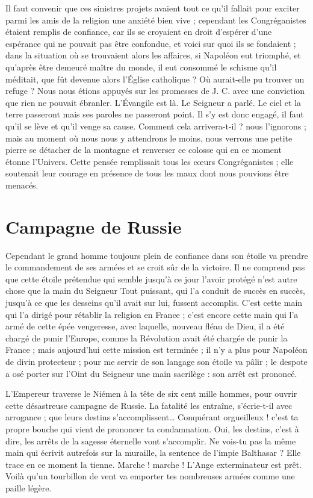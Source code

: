 Il faut convenir que ces sinistres projets avaient tout ce qu'il fallait pour exciter parmi les amis de la religion une anxiété bien vive ; cependant les Congréganistes étaient remplis de confiance, car ils se croyaient en droit d'espérer d'une espérance qui ne pouvait pas être confondue, et voici sur quoi ils se fondaient ; dans la situation où se trouvaient alors les affaires, si Napoléon eut triomphé, et qu'après être demeuré maître du monde, il eut consommé le schisme qu'il méditait, que fût devenue alors l'Église catholique ? Où aurait-elle pu trouver un refuge ? Nous nous étions appuyés sur les promesses de J. C. avec une conviction que rien ne pouvait ébranler. L'Évangile est là. Le Seigneur a parlé. Le ciel et la terre passeront mais ses paroles ne passeront point. Il s'y est donc engagé, il faut qu'il se lève et qu'il venge sa cause. Comment cela arrivera-t-il ? nous l'ignorons ; mais au moment où nous nous y attendrons le moins, nous verrons une petite pierre se détacher de la montagne et renverser ce colosse qui en ce moment étonne l'Univers. Cette pensée remplissait tous les cœurs Congréganistes ; elle soutenait leur courage en présence de tous les maux dont nous pouvions être menacés.

\section*{Campagne de Russie}
Cependant le grand homme toujours plein de confiance dans son étoile va prendre le commandement de ses armées et se croit sûr de la victoire. Il ne comprend pas que cette étoile prétendue qui semble jusqu'à ce jour l'avoir protégé n'est autre chose que la main du Seigneur Tout puissant, qui l'a conduit de succès en succès, jusqu'à ce que les desseins qu'il avait sur lui, fussent accomplis. C'est cette main qui l'a
dirigé pour rétablir la religion en France ; c'est encore cette main qui l'a armé de cette épée vengeresse, avec laquelle, nouveau fléau de Dieu, il a été chargé de punir l'Europe, comme la Révolution avait été chargée de punir la France ; mais aujourd'hui cette mission est terminée ; il n'y a plus pour Napoléon de divin protecteur ; pour me servir de son langage son étoile va pâlir ; le despote a osé porter sur l'Oint du Seigneur une main sacrilège : son arrêt est prononcé.

L'Empereur traverse le Niémen à la tête de six cent mille hommes, pour ouvrir cette désastreuse campagne de Russie. La fatalité les entraîne, s'écrie-t-il avec arrogance ; que leurs destins s'accomplissent… Conquérant orgueilleux ! c'est ta propre bouche qui vient de prononcer ta condamnation. Oui, les destins, c'est à dire, les arrêts de la sagesse éternelle vont s'accomplir. Ne vois-tu pas la même main qui écrivit autrefois sur la muraille, la sentence de l'impie Balthasar ? Elle trace en ce moment la tienne. Marche ! marche ! L'Ange exterminateur est prêt. Voilà qu'un tourbillon de vent va emporter tes nombreuses armées comme une paille légère.

